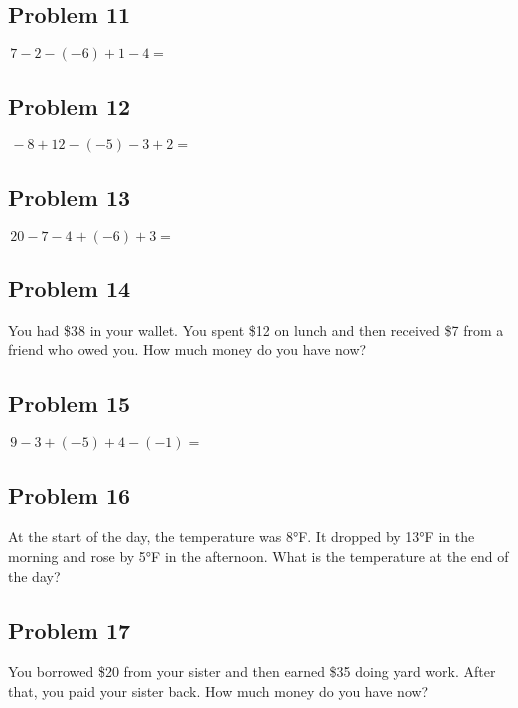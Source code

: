 \documentclass[12pt]{article}
\begin{document}
\subsection*{Problem 11}
\(\,7 - 2 - (-6) + 1 - 4 =\)

\subsection*{Problem 12}
\(\,-8 + 12 - (-5) - 3 + 2 =\)

\subsection*{Problem 13}
\(\,20 - 7 - 4 + (-6) + 3 =\)

\subsection*{Problem 14}
You had \$38 in your wallet. You spent \$12 on lunch and then received \$7 from a friend who owed you. How much money do you have now?


\subsection*{Problem 15}
\(\,9 - 3 + (-5) + 4 - (-1) =\)

\subsection*{Problem 16}
At the start of the day, the temperature was 8°F. It dropped by 13°F in the morning and rose by 5°F in the afternoon. What is the temperature at the end of the day?

\subsection*{Problem 17}
You borrowed \$20 from your sister and then earned \$35 doing yard work. After that, you paid your sister back. How much money do you have now?
\end{document}
